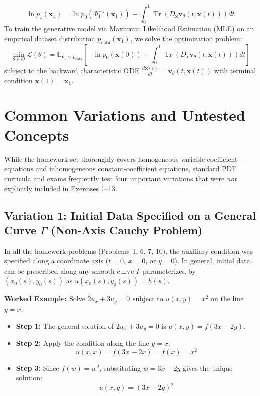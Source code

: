 \documentclass[11pt]{article}
\begin{document}
\begin{itemize}
    \[
    \ln p_1(\mathbf{x}_1) = \ln p_0(\Phi_1^{-1}(\mathbf{x}_1)) - \int_0^1 \operatorname{Tr}\left(D_{\mathbf{x}}\mathbf{v}_\theta(t, \mathbf{x}(t))\right)dt
    \]
    To train the generative model via Maximum Likelihood Estimation (MLE) on an empirical dataset distribution $p_{\text{data}}(\mathbf{x}_1)$, we solve the optimization problem:
    \[
    \min_{\theta \in \Theta} \mathcal{L}(\theta) = \mathbb{E}_{\mathbf{x}_1 \sim p_{\text{data}}}\left[ -\ln p_0(\mathbf{x}(0)) + \int_0^1 \operatorname{Tr}\left(D_{\mathbf{x}}\mathbf{v}_\theta(t, \mathbf{x}(t))\right)dt \right]
    \]
    subject to the backward characteristic ODE $\frac{d\mathbf{x}(t)}{dt} = \mathbf{v}_\theta(t, \mathbf{x}(t))$ with terminal condition $\mathbf{x}(1) = \mathbf{x}_1$.
\end{itemize}

\newpage
\section{Common Variations and Untested Concepts}

While the homework set thoroughly covers homogeneous variable-coefficient equations and inhomogeneous constant-coefficient equations, standard PDE curricula and exams frequently test four important variations that were \emph{not} explicitly included in Exercises 1--13:

\subsection{Variation 1: Initial Data Specified on a General Curve $\Gamma$ (Non-Axis Cauchy Problem)}
In all the homework problems (Problems 1, 6, 7, 10), the auxiliary condition was specified along a coordinate axis ($t = 0$, $x = 0$, or $y = 0$). In general, initial data can be prescribed along any smooth curve $\Gamma$ parameterized by $(x_0(s), y_0(s))$ as $u(x_0(s), y_0(s)) = h(s)$.

\noindent\textbf{Worked Example:} Solve $2u_x + 3u_y = 0$ subject to $u(x, y) = x^2$ on the line $y = x$.
\begin{itemize}
    \item \textbf{Step 1:} The general solution of $2u_x + 3u_y = 0$ is $u(x, y) = f(3x - 2y)$.
    \item \textbf{Step 2:} Apply the condition along the line $y = x$:
    \[
    u(x, x) = f(3x - 2x) = f(x) = x^2
    \]
    \item \textbf{Step 3:} Since $f(w) = w^2$, substituting $w = 3x - 2y$ gives the unique solution:
    \[
    u(x, y) = (3x - 2y)^2
    \]
\end{itemize}
\end{document}
